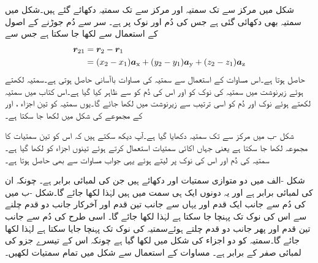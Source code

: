 شکل  میں  مرکز سے  تک سمتیہ  اور  مرکز سے  تک سمتیہ  دکھائے گئے ہیں۔شکل میں سمتیہ  بھی دکھائی گئی ہے جس کی دُم   اور  نوک  پر ہے۔ سر سے دُم جوڑنے کے اصول کے استعمال سے  لکھا جا سکتا ہے جس سے
\begin{gather}
\begin{aligned}\label{مساوات_سمتیہ_کارتیسی_نظام_میں_قیمت}
{\ensuremath{{\boldsymbol{r}}}}_{21}&={{\boldsymbol{r}}}_2-{{\boldsymbol{r}}}_1\\
&=(x_2-x_1) {\boldsymbol{a}}_{\textup{x}}+(y_2-y_1){\boldsymbol{a}}_{\textup{y}}+(z_2-z_1){\boldsymbol{a}}_{\textup{z}}
\end{aligned}
\end{gather}
حاصل ہوتا ہے۔اس مساوات کے استعمال سے سمتیہ کی مساوات باآسانی حاصل ہوتی ہے۔سمتیہ  لکھتے ہوئے زیرنوشت میں سمتیہ کی نوک کو  اور اس کی دُم  کو  سے ظاہر کیا گیا ہے۔اس کتاب میں سمتیہ لکھتے ہوئے نوک اور دُم  کو اسی ترتیب سے زیرنوشت میں لکھا جائے گا۔یوں سمتیہ  کو تین اجزاء ،  اور  کے مجموعے کی شکل میں لکھا جا سکتا ہے۔

شکل -ب میں مرکز سے  تک سمتیہ دکھایا گیا ہے۔آپ دیکھ سکتے ہیں کہ اس کو تین سمتیات کا مجموعہ لکھا جا سکتا ہے یعنی  جہاں اکائی سمتیات استعمال کرتے ہوئے تینوں اجزاء کو لکھا گیا ہے۔ سمتیہ کی دُم  اور اس کی نوک  پر لیتے ہوئے  یہی جواب  مساوات  سے بھی حاصل ہوتا ہے۔

شکل -الف میں دو متوازی سمتیات  اور  دکھائے ہیں جن کی لمبائی برابر ہے۔ چونکہ ان کی لمبائی برابر ہے اور یہ دونوں ایک ہی سمت میں ہیں لہٰذا  لکھا جائے گا۔شکل -ب میں  کی دُم سے  جانب ایک قدم اور یہاں سے  جانب تین قدم اور آخرکار  جانب دو قدم چلنے سے اس کی نوک تک پہنچا جا سکتا ہے لہٰذا  لکھا جائے گا۔ اسی طرح  کی دُم سے   جانب تین قدم اور پھر  جانب دو قدم چلتے ہوئےسمتیہ کی نوک تک پہنچا جایا سکتا ہے لہٰذا  لکھا جائے گا۔سمتیہ  کو دو اجزاء کی شکل میں لکھا گیا ہے چونکہ اس کے تیسرے جزو کی لمبائی صفر کے برابر ہے۔
مساوات  کے استعمال سے شکل  میں تمام سمتیات لکھیں۔

